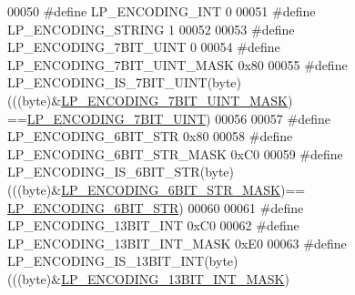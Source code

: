 \begin{DoxyCode}
00050 \textcolor{preprocessor}{#}\textcolor{preprocessor}{define} \textcolor{preprocessor}{LP\_ENCODING\_INT} 0
00051 \textcolor{preprocessor}{#}\textcolor{preprocessor}{define} \textcolor{preprocessor}{LP\_ENCODING\_STRING} 1
00052 
00053 \textcolor{preprocessor}{#}\textcolor{preprocessor}{define} \textcolor{preprocessor}{LP\_ENCODING\_7BIT\_UINT} 0
00054 \textcolor{preprocessor}{#}\textcolor{preprocessor}{define} \textcolor{preprocessor}{LP\_ENCODING\_7BIT\_UINT\_MASK} 0x80
00055 \textcolor{preprocessor}{#}\textcolor{preprocessor}{define} \textcolor{preprocessor}{LP\_ENCODING\_IS\_7BIT\_UINT}\textcolor{preprocessor}{(}\textcolor{preprocessor}{byte}\textcolor{preprocessor}{)} \textcolor{preprocessor}{(}\textcolor{preprocessor}{(}\textcolor{preprocessor}{(}\textcolor{preprocessor}{byte}\textcolor{preprocessor}{)}\textcolor{preprocessor}{&}\hyperlink{listpack_8c_aba3f3787e93f67472017620bfe1bbb9e}{LP\_ENCODING\_7BIT\_UINT\_MASK}\textcolor{preprocessor}{)}\textcolor{preprocessor}{
      ==}\hyperlink{listpack_8c_ac949eb1675d053989cb72d263486d708}{LP\_ENCODING\_7BIT\_UINT}\textcolor{preprocessor}{)}
00056 
00057 \textcolor{preprocessor}{#}\textcolor{preprocessor}{define} \textcolor{preprocessor}{LP\_ENCODING\_6BIT\_STR} 0x80
00058 \textcolor{preprocessor}{#}\textcolor{preprocessor}{define} \textcolor{preprocessor}{LP\_ENCODING\_6BIT\_STR\_MASK} 0xC0
00059 \textcolor{preprocessor}{#}\textcolor{preprocessor}{define} \textcolor{preprocessor}{LP\_ENCODING\_IS\_6BIT\_STR}\textcolor{preprocessor}{(}\textcolor{preprocessor}{byte}\textcolor{preprocessor}{)} \textcolor{preprocessor}{(}\textcolor{preprocessor}{(}\textcolor{preprocessor}{(}\textcolor{preprocessor}{byte}\textcolor{preprocessor}{)}\textcolor{preprocessor}{&}\hyperlink{listpack_8c_a0a64f1c1f90ecdcfc49ec3b738268601}{LP\_ENCODING\_6BIT\_STR\_MASK}\textcolor{preprocessor}{)}\textcolor{preprocessor}{==}
      \hyperlink{listpack_8c_aa03a77428cf5dd11a741306d35f08d6f}{LP\_ENCODING\_6BIT\_STR}\textcolor{preprocessor}{)}
00060 
00061 \textcolor{preprocessor}{#}\textcolor{preprocessor}{define} \textcolor{preprocessor}{LP\_ENCODING\_13BIT\_INT} 0xC0
00062 \textcolor{preprocessor}{#}\textcolor{preprocessor}{define} \textcolor{preprocessor}{LP\_ENCODING\_13BIT\_INT\_MASK} 0xE0
00063 \textcolor{preprocessor}{#}\textcolor{preprocessor}{define} \textcolor{preprocessor}{LP\_ENCODING\_IS\_13BIT\_INT}\textcolor{preprocessor}{(}\textcolor{preprocessor}{byte}\textcolor{preprocessor}{)} \textcolor{preprocessor}{(}\textcolor{preprocessor}{(}\textcolor{preprocessor}{(}\textcolor{preprocessor}{byte}\textcolor{preprocessor}{)}\textcolor{preprocessor}{&}\hyperlink{listpack_8c_a0770ec079e38f29b013d6014e268ff1f}{LP\_ENCODING\_13BIT\_INT\_MASK}\textcolor{preprocessor}{)}\textcolor{preprocessor}{
}
\end{DoxyCode}
